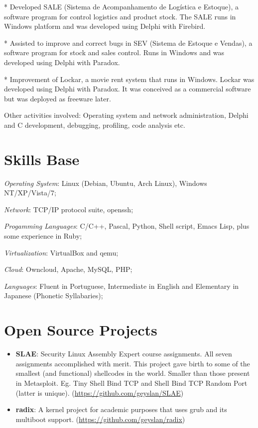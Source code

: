 \documentclass[margin]{res}
\begin{document}
\begin{resume}
* Developed SALE (Sistema de Acompanhamento de Logística e Estoque), a software
program for control logistics and product stock. The SALE runs in Windows
platform and was developed using Delphi with Firebird.

* Assisted to improve and correct bugs in SEV (Sistema de Estoque e Vendas), a
software program for stock and sales control. Runs in Windows and was developed
using Delphi with Paradox.

* Improvement of Lockar, a movie rent system that runs in Windows. Lockar was
developed using Delphi with Paradox. It was conceived as a commercial software
but was deployed as freeware later.

Other activities involved: Operating system and network administration, Delphi
and C development, debugging, profiling, code analysis etc.

\section{Skills Base} \textit{Operating System}: Linux (Debian, Ubuntu, Arch
Linux), Windows NT/XP/Vista/7;

\textit{Network}: TCP/IP protocol suite, openssh;

\textit{Progamming Languages}: C/C++, Pascal, Python, Shell script, Emacs Lisp,
plus some experience in Ruby;

\textit{Virtualization}: VirtualBox and qemu;

\textit{Cloud}: Owncloud, Apache, MySQL, PHP;

\textit{Languages}: Fluent in Portuguese, Intermediate in English and
Elementary in Japanese (Phonetic Syllabaries);

\section{Open Source Projects}
\begin{itemize}
\item \textbf{SLAE}: Security Linux Assembly Expert course assignments. All
  seven assignments accomplished with merit. This project gave birth to some of
  the smallest (and functional) shellcodes in the world. Smaller than those
  present in Metasploit. Eg. Tiny Shell Bind TCP and Shell Bind TCP Random Port
  (latter is unique).\newline
  (\url{https://github.com/geyslan/SLAE})\vspace{1mm}

\item \textbf{radix}: A kernel project for academic purposes that uses grub and
  its multiboot support.\newline
  (\url{https://github.com/geyslan/radix})\vspace{1mm}


\end{itemize}
\end{resume}
\end{document}
